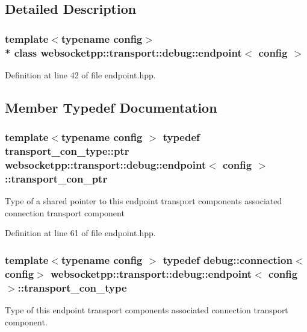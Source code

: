 \subsection{Detailed Description}
\subsubsection*{template$<$typename config$>$\\*
class websocketpp\+::transport\+::debug\+::endpoint$<$ config $>$}



Definition at line 42 of file endpoint.\+hpp.



\subsection{Member Typedef Documentation}
\subsubsection[{\texorpdfstring{transport\+\_\+con\+\_\+ptr}{transport\_con\_ptr}}]{\setlength{\rightskip}{0pt plus 5cm}template$<$typename config $>$ typedef {\bf transport\+\_\+con\+\_\+type\+::ptr} {\bf websocketpp\+::transport\+::debug\+::endpoint}$<$ {\bf config} $>$\+::{\bf transport\+\_\+con\+\_\+ptr}}\hypertarget{classwebsocketpp_1_1transport_1_1debug_1_1endpoint_ab261a090fca072aea9b5dba04aba4c6d}{}\label{classwebsocketpp_1_1transport_1_1debug_1_1endpoint_ab261a090fca072aea9b5dba04aba4c6d}
Type of a shared pointer to this endpoint transport component\textquotesingle{}s associated connection transport component 

Definition at line 61 of file endpoint.\+hpp.

\subsubsection[{\texorpdfstring{transport\+\_\+con\+\_\+type}{transport\_con\_type}}]{\setlength{\rightskip}{0pt plus 5cm}template$<$typename config $>$ typedef {\bf debug\+::connection}$<${\bf config}$>$ {\bf websocketpp\+::transport\+::debug\+::endpoint}$<$ {\bf config} $>$\+::{\bf transport\+\_\+con\+\_\+type}}\hypertarget{classwebsocketpp_1_1transport_1_1debug_1_1endpoint_a267bc670b0cecf80aa39ee266785e9ba}{}\label{classwebsocketpp_1_1transport_1_1debug_1_1endpoint_a267bc670b0cecf80aa39ee266785e9ba}
Type of this endpoint transport component\textquotesingle{}s associated connection transport component. 

